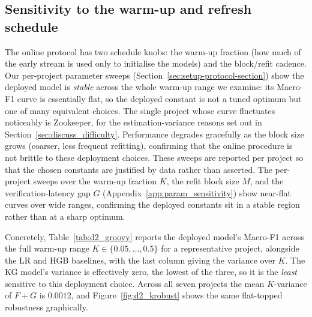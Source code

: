 \documentclass[final,5p,times,twocolumn]{elsarticle}
\theoremstyle{plain}
\begin{document}
\subsection{Sensitivity to the warm-up and refresh schedule}
\label{sec:discuss_warmup}
The online protocol has two schedule knobs: the warm-up fraction (how much of the
early stream is used only to initialise the models) and the block/refit cadence. Our
per-project parameter sweeps (Section~\ref{sec:setup-protocol-section}) show the
deployed model is \emph{stable} across the whole warm-up range we examine: its
Macro-F1 curve is essentially flat, so the deployed constant is not a tuned optimum but
one of many equivalent choices. The single project whose curve fluctuates noticeably is
Zookeeper, for the estimation-variance reasons set out in
Section~\ref{sec:discuss_difficulty}. Performance degrades
gracefully as the block size grows (coarser, less frequent refitting), confirming
that the online procedure is not brittle to these deployment choices. These sweeps
are reported per project so that the chosen constants are justified by data rather
than asserted. The per-project sweeps over the warm-up fraction $K$, the refit block
size $M$, and the verification-latency gap $G$ (Appendix~\ref{app:param_sensitivity})
show near-flat curves over wide ranges, confirming the deployed constants sit in a
stable region rather than at a sharp optimum.

Concretely, Table~\ref{tab:d2_groovy} reports the deployed model's Macro-F1
across the full warm-up range $K\in\{0.05,\dots,0.5\}$ for a representative project,
alongside the LR and HGB baselines, with the last column giving the variance over $K$.
The KG model's variance is effectively zero, the lowest of the three, so it is the
\emph{least} sensitive to this deployment choice. Across all seven projects the mean
$K$-variance of $F{+}G$ is $0.0012$, and Figure~\ref{fig:d2_krobust} shows the same
flat-topped robustness graphically.

\begin{table}[t]\centering\footnotesize\setlength{\tabcolsep}{3pt}
\caption{D2: robustness of the deployed model to Warm-up fraction $K$, averaged over the seven active projects. Each cell is the cross-project mean at that parameter value; \emph{Var.} is the variance of that mean across the sweep. A small variance means the deployed constant is one of many equivalent choices rather than a tuned optimum.}
\label{tab:d2_macroavg_K}
\end{table}
\end{document}
